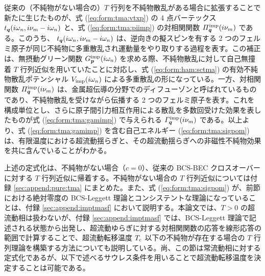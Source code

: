 従来の（不純物がない場合の）$T$ 行列を不純物散乱がある場合に拡張することで新たに生じたものが、式 (\ref{eq:form:tma:vtxp}) の 4 点バーテックス $t_{\bm{q}}(i\omega_n,i\nu_m-i\omega_n)$ と、式 (\ref{eq:form:tma:piimp}) の対相関関数 $\varPi^{\text{imp}}_{\bm{q}}(i\nu_m)$ である。このうち、 $t_{\bm{q}}(i\omega_n,i\nu_m-i\omega_n)$ は、逆向きの擬スピンを有する 2 つのフェルミ原子が同じ不純物に多重散乱され運動量をやり取りする過程を表す。この補正は、無摂動グリーン関数 $G^{\text{imp}}_{\bm{p}}(i\omega_n)$ を求める際、不純物散乱に対して自己無撞着 $T$ 行列近似を用いていたことに対応し、式 (\ref{eq:form:ham:sctma}) の有効不純物散乱ポテンシャル $V_{\text{imp}} (i\omega_n)$ による多重散乱の形になっている。一方、対相関関数 $\varPi^{\text{imp}}_{\bm{q}}(i\nu_m)$ は、金属超伝導の分野でのディフューゾンと呼ばれているものであり、不純物散乱を受けながら伝播する 2 つのフェルミ原子を表す。これを構成単位とし、さらに原子間引力相互作用による散乱を多数回受けた効果を表したものが式 (\ref{eq:form:tma:gamimp}) で与えられる $\varGamma^{\text{imp}}_{\bm{q}}(i\nu_m)$ である。以上より、式 (\ref{eq:form:tma:gamimp}) を含む自己エネルギー (\ref{eq:form:tma:sigpom}) は、有限温度における超流動揺らぎと、その超流動揺らぎへの非磁性不純物効果を共に含んでいることがわかる。


上述の定式化は、不純物がない場合（$c=0$）、従来の BCS-BEC クロスオーバーに対する $T$ 行列近似に帰着する。不純物がない場合の $T$ 行列近似については付録 \ref{sec:append:pure:tma} にまとめた。また、式 (\ref{eq:form:tma:sigpom}) が、前節における絶対零度の BCS-Leggett 理論とコンシステントな理論になっていることは、付録 \ref{sec:append:imptmasf} において説明する。本論文では、$T>0$ の超流動相は扱わないが、付録 \ref{sec:append:imptmasf} では、BCS-Leggett 理論で記述される状態から出発し、超流動ゆらぎに対する対相関関数の応答を線形応答の範囲で計算することで、超流動転移温度 $T_{\text{c}}$ 以下の不純物が存在する場合の $T$ 行列理論を構築する方法についても説明している。尚、この節は常流動相に対する定式化であるが、以下で述べるサウレス条件を用いることで超流動転移温度を決定することは可能である。

